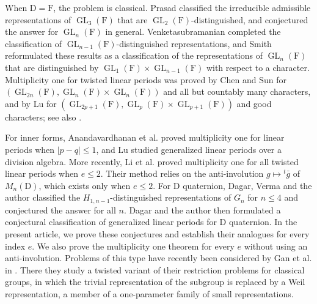\documentclass[11pt]{amsart}
\numberwithin{equation}{section}
\theoremstyle{plain}
\theoremstyle{definition}
\theoremstyle{remark}
\DeclareMathOperator{\GL}{GL}
\begin{document}
When $\mathrm{D}=\mathrm{F}$, the problem is classical. Prasad \cite[Theorem 2]{Pra93} classified the irreducible admissible representations of $\GL_3(\mathrm{F})$ that are $\GL_2(\mathrm{F})$-distinguished, and conjectured the answer for $\GL_n(\mathrm{F})$ in general. Venketasubramanian \cite[Corollary 6.15]{Ven13} completed the classification of $\GL_{n-1}(\mathrm{F})$-distinguished representations, and Smith \cite[Corollary~A.2.2]{Smi17} reformulated these results as a classification of the representations of $\GL_n(\mathrm{F})$ that are distinguished by $\GL_1(\mathrm{F})\times\GL_{n-1}(\mathrm{F})$ with respect to a character. Multiplicity one for twisted linear periods was proved by Chen and Sun \cite[Theorem B]{CS20} for $(\GL_{2n}(\mathrm{F}),\GL_n(\mathrm{F})\times\GL_n(\mathrm{F}))$ and all but countably many characters, and by Lu \cite[Theorem 1.1]{Lu22} for $(\GL_{2p+1}(\mathrm{F}),\GL_p(\mathrm{F})\times\GL_{p+1}(\mathrm{F}))$ and good characters; see also \cite{JR96,AGRS10}.

 For inner forms, Anandavardhanan et al.  \cite[Theorem 2.5]{ALMSY24} proved multiplicity one for linear periods when $|p-q|\le1$, and Lu \cite[Theorem 1.3]{Lu26} studied generalized linear periods over a division algebra. More recently, Li et al. \cite[Theorem 1.1]{LLX26} proved multiplicity one for all twisted linear periods when $e\le2$. Their method relies on the anti-involution $g\mapsto{}^t\bar g$ of $M_n(\mathrm{D})$, which exists only when $e\le2$. For $\mathrm{D}$ quaternion, Dagar, Verma and the author \cite[Conjecture 1.1]{DSV27} classified the $H_{1,n-1}$-distinguished representations of $G_n$ for $n\le4$ and conjectured the answer for all $n$. Dagar and the author \cite[Conjecture 1.1]{DS26} then formulated a conjectural classification of generalized linear periods for $\mathrm{D}$ quaternion. In the present article, we prove these conjectures and establish their analogues for every index $e$. We also prove the multiplicity one theorem for every $e$ without using an anti-involution. 
Problems of this type have recently been considered by Gan et al. in  \cite[Conjecture 1.1]{GGP23}. There they study a twisted variant of their restriction problems for classical groups, in which the trivial representation of the subgroup is replaced by a Weil representation, a member of a one-parameter family of small representations.
\end{document}
